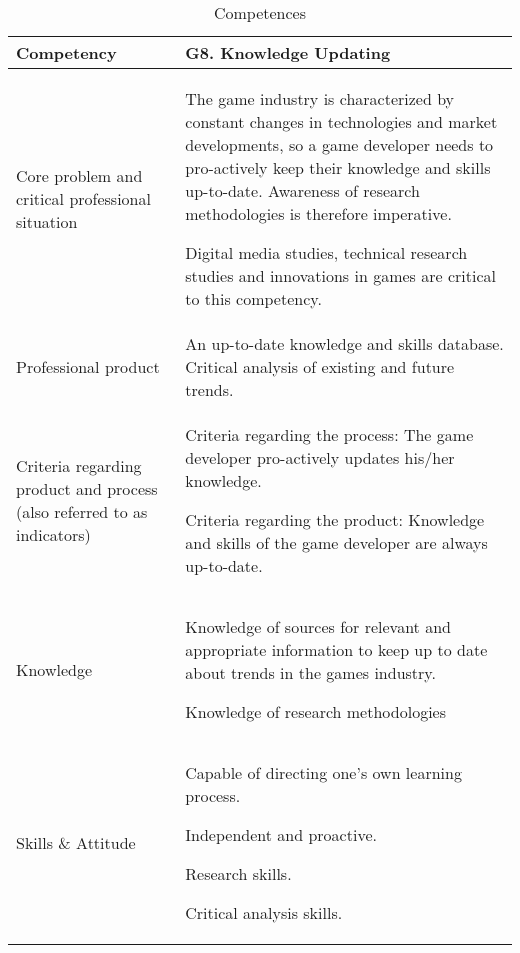 \documentclass{article}
\begin{document}
\begin{table}[ht]
\caption{Competences}
\centering
\begin{tabular}{| p{4cm} | p{7cm} |}

\hline

\textbf{Competency} & \textbf{G8. Knowledge Updating} \\

\hline

Core problem and critical professional situation &

The game industry is characterized by constant changes in technologies and market developments, so a game developer needs to pro-actively keep their knowledge and skills up-to-date. Awareness of research methodologies is therefore imperative.

Digital media studies, technical research studies and innovations in games are critical to this competency. \\


\hline

Professional product &


An up-to-date knowledge and skills database. 
Critical analysis of existing and future trends. \\


\hline

Criteria regarding product and process (also referred to as indicators) &

Criteria regarding the process: The game developer pro-actively updates his/her knowledge. 

Criteria regarding the product: Knowledge and skills of the game developer are always up-to-date.  \\


\hline

Knowledge &

Knowledge of sources for relevant and appropriate information to keep up to date about trends in the games industry.

Knowledge of research methodologies \\


\hline

Skills \& Attitude &

Capable of directing one's own learning process.

Independent and proactive.

Research skills.

Critical analysis skills. \\

\hline

\end{tabular}
\label{Table:Competences}
\end{table}
\end{document}
